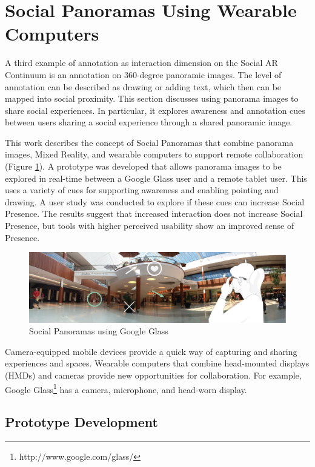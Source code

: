 \pagebreak
\section{Social Panoramas Using Wearable Computers}
\label{sec:pano}

A third example of annotation as interaction dimension on the Social AR Continuum is an annotation on 360-degree panoramic images. The level of annotation can be described as drawing or adding text, which then can be mapped into social proximity. This section discusses using panorama images to share social experiences. In particular, it explores awareness and annotation cues between users sharing a social experience through a shared panoramic image.

This work describes the concept of Social Panoramas that combine panorama images, Mixed Reality, and wearable computers to support remote collaboration \cite{Reichherzer2014, Billinghurst2014} (Figure \ref{fig:ismar14:concept}). A prototype was developed that allows panorama images to be explored in real-time between a Google Glass user and a remote tablet user. This uses a variety of cues for supporting awareness and enabling pointing and drawing. A user study was conducted to explore if these cues can increase Social Presence. The results suggest that increased interaction does not increase Social Presence, but tools with higher perceived usability show an improved sense of Presence.

\begin{figure}
    \centering
    \includegraphics[width=\linewidth]{images/63-pano-ismar14/concept}
    \caption{Social Panoramas using Google Glass}
    \label{fig:ismar14:concept}
\end{figure}

Camera-equipped mobile devices provide a quick way of capturing and sharing experiences and spaces. Wearable computers that combine head-mounted displays (HMDs) and cameras provide new opportunities for collaboration. For example, Google Glass\footnote{http://www.google.com/glass/} has a camera, microphone, and head-worn display.

\subsection{Prototype Development}

